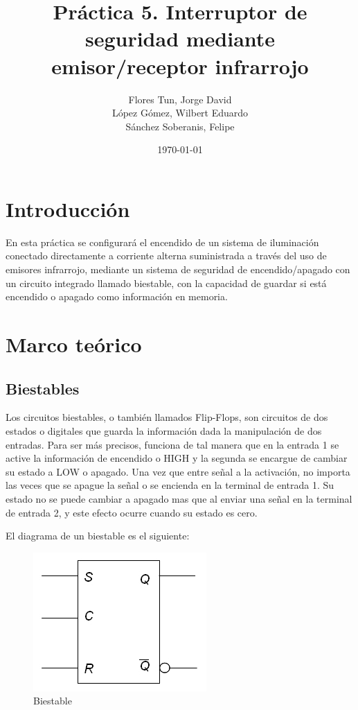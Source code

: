 \documentclass{article}
\title{Práctica 5. Interruptor de seguridad mediante emisor/receptor infrarrojo}
\author{Flores Tun, Jorge David\\ López Gómez, Wilbert Eduardo\\ Sánchez Soberanis, Felipe}
\date{\today}
\begin{document}
\maketitle

\tableofcontents

\section{Introducción}
En esta práctica se configurará el encendido de un sistema de iluminación conectado directamente a corriente alterna suministrada
a través del uso de emisores infrarrojo, mediante un sistema de seguridad de encendido/apagado con un circuito integrado
llamado biestable, con la capacidad de guardar si está encendido o apagado como información en memoria.

\section{Marco teórico}

\subsection{Biestables}
Los circuitos biestables, o también llamados Flip-Flops, son circuitos de dos estados o digitales que guarda la información
dada la manipulación de dos entradas. Para ser más precisos, funciona de tal manera que en la entrada 1 se active la información
de encendido o HIGH y la segunda se encargue de cambiar su estado a LOW o apagado. Una vez que entre señal a la activación, no
importa las veces que se apague la señal o se encienda en la terminal de entrada 1. Su estado no se puede cambiar a apagado mas
que al enviar una señal en la terminal de entrada 2, y este efecto ocurre cuando su estado es cero. 
\parencite{markovic2001analysis}

El diagrama de un biestable es el siguiente:

\begin{figure}
    \centering
    \includegraphics[scale=0.5]{Biestable.jpg}
    \caption{Biestable}
    \label{Fig: Circuito biestable}
\end{figure}
\end{document}

